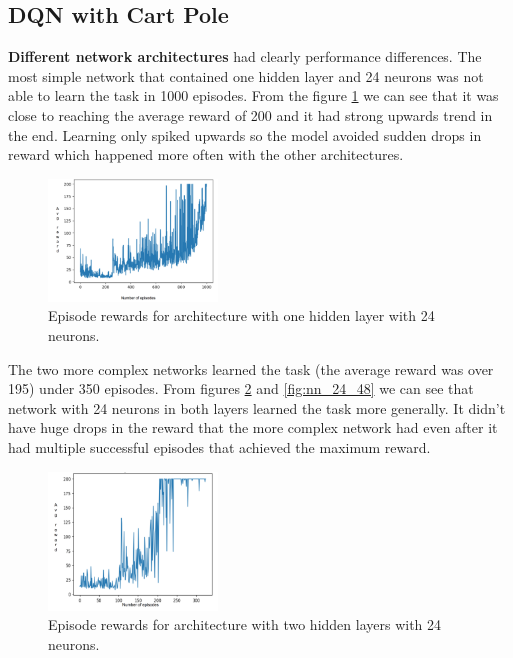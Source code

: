 \subsection{DQN with Cart Pole}
\textbf{Different network architectures} had clearly performance differences. The most simple network that contained one hidden layer and 24 neurons was not able to learn the task in 1000 episodes. From the figure \ref{fig:nn_24} we can see that it was close to reaching the average reward of 200 and it had strong upwards trend in the end. Learning only spiked upwards so the model avoided sudden drops in reward which happened more often with the other architectures.

\begin{figure}[H]
    \centering
    \includegraphics[width=0.4\textwidth]{images/nn_24.png}
    \caption{
    Episode rewards for architecture with one hidden layer with 24 neurons.
    }
    \label{fig:nn_24}
\end{figure}

The two more complex networks learned the task (the average reward was over 195) under 350 episodes. From figures \ref{fig:nn_24_24} and \ref{fig:nn_24_48} we can see that network with 24 neurons in both layers learned the task more generally. It didn't have huge drops in the reward that the more complex network had even after it had multiple successful episodes that achieved the maximum reward.

\begin{figure}[H]
    \centering
    \includegraphics[width=0.4\textwidth]{images/nn_24_24.png}
    \caption{
    Episode rewards for architecture with two hidden layers with 24 neurons.
    }
    \label{fig:nn_24_24}
\end{figure}

